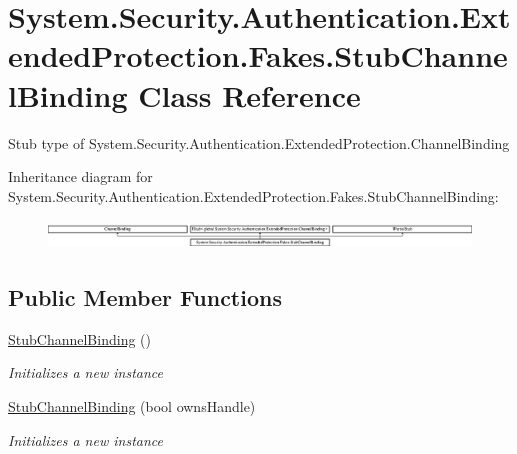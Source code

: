 \hypertarget{class_system_1_1_security_1_1_authentication_1_1_extended_protection_1_1_fakes_1_1_stub_channel_binding}{\section{System.\-Security.\-Authentication.\-Extended\-Protection.\-Fakes.\-Stub\-Channel\-Binding Class Reference}
\label{class_system_1_1_security_1_1_authentication_1_1_extended_protection_1_1_fakes_1_1_stub_channel_binding}
}


Stub type of System.\-Security.\-Authentication.\-Extended\-Protection.\-Channel\-Binding 


Inheritance diagram for System.\-Security.\-Authentication.\-Extended\-Protection.\-Fakes.\-Stub\-Channel\-Binding\-:\begin{figure}[H]
\begin{center}
\leavevmode
\includegraphics[height=0.760353cm]{class_system_1_1_security_1_1_authentication_1_1_extended_protection_1_1_fakes_1_1_stub_channel_binding}
\end{center}
\end{figure}
\subsection*{Public Member Functions}
\begin{DoxyCompactItemize}
\item 
\hyperlink{class_system_1_1_security_1_1_authentication_1_1_extended_protection_1_1_fakes_1_1_stub_channel_binding_ad2a045b493fbc82781ba2e42a0755931}{Stub\-Channel\-Binding} ()
\begin{DoxyCompactList}\small\item\em Initializes a new instance\end{DoxyCompactList}\item 
\hyperlink{class_system_1_1_security_1_1_authentication_1_1_extended_protection_1_1_fakes_1_1_stub_channel_binding_a1da84e048cf5b50bbb9da17192a33753}{Stub\-Channel\-Binding} (bool owns\-Handle)
\begin{DoxyCompactList}\small\item\em Initializes a new instance\end{DoxyCompactList}\end{DoxyCompactItemize}
